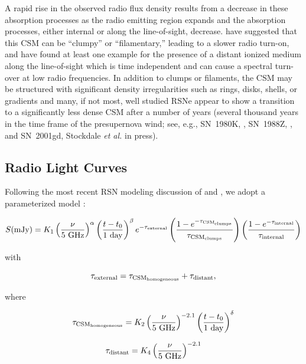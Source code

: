\documentclass[12pt,preprint]{aastex}
\newcommand{\etal}{{\it et al. }}
\begin{document}
A rapid rise in the observed radio flux density results from a decrease in these absorption processes as the radio emitting region expands and
the absorption processes, either internal or along the line-of-sight,
decrease.  \citet{Weiler90} have suggested that this CSM can be
``clumpy'' or ``filamentary,'' leading to a slower radio turn-on, and
\citet{Montes97} have found at least one example for the presence of
a distant ionized medium along the line-of-sight which is time
independent and can cause a spectral turn-over at low radio
frequencies.  In addition to clumps or filaments, the CSM may be
structured with significant density irregularities such as rings, disks,
shells, or gradients and many, if not most, well studied RSNe appear to
show a transition to a significantly less dense CSM after a number of
years (several thousand years in the time frame of the presupernova
wind; see, e.g., SN~1980K, \citet{Montes98}, SN~1988Z, \citet{VanDyk93c,Williams02}, and SN~2001gd, Stockdale
\etal in press).

\subsection{Radio Light Curves}

Following the most recent RSN modeling discussion of \citet{Weiler02}
and \citet{Sramek03}, we adopt a parameterized model :

\begin{equation}
\label{eq2}
S(\mbox{mJy}) = K_1 \left(\frac{\nu}{\mbox{5\
GHz}}\right)^{\alpha} \left(\frac{t-t_0}{\mbox{1\ day}}\right)^{\beta}
e^{-\tau_{\rm external}} \left(\frac{1-e^{-\tau_{{\rm CSM}_{\rm clumps}}}}{\tau_{{\rm CSM}_{\rm
clumps}}}\right) \left(\frac{1-e^{-\tau_{\rm internal}}}{\tau_{\rm internal}}\right) 
\end{equation} 

\noindent with  

\begin{equation}
\label{eq3}
\tau_{\rm external}  =  \tau_{{\rm CSM}_{\rm homogeneous}}+\tau_{\rm distant},
\end{equation}

\noindent where

\begin{equation}
\label{eq4}
\tau_{{\rm CSM}_{\rm homogeneous}}  =  K_2
\left(\frac{\nu}{\mbox{5 GHz}}\right)^{-2.1}
\left(\frac{t-t_0}{\mbox{1\ day}}\right)^{\delta}
\end{equation}

\begin{equation}
\label{eq5}
\tau_{\rm distant}  =  K_4  \left(\frac{\nu}{\mbox{5\
GHz}}\right)^{-2.1}
\end{equation} 
\end{document}
